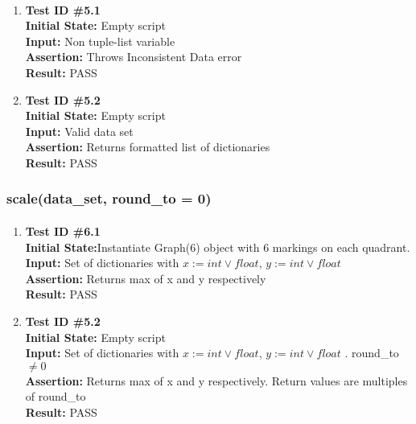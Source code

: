 \documentclass[12pt, titlepage]{article}
\begin{document}
	\paragraph{}
		\begin{enumerate}
			\item{\textbf{Test ID \#5.1\\}}
			\textbf{Initial State:} Empty script\\
			\textbf{Input:} Non tuple-list variable\\
			\textbf{Assertion:} Throws Inconsistent Data error\\
			\textbf{Result:} PASS
			
			\item{\textbf{Test ID \#5.2\\}}
			\textbf{Initial State:} Empty script\\
			\textbf{Input:} Valid data set \\
			\textbf{Assertion:} Returns formatted list of dictionaries\\
			\textbf{Result:} PASS

		\end{enumerate}		

\subsubsection{scale(data\_set, round\_to = 0)}		
	\label{sec:4.0.5}
	\paragraph{}
		\begin{enumerate}
			\item{\textbf{Test ID \#6.1\\}}
			\textbf{Initial State:}Instantiate Graph(6) object with 6 markings on each quadrant.\\
			\textbf{Input:} Set of dictionaries with $x:= int \vee float$, $y:= int \vee float$ \\
			\textbf{Assertion:} Returns max of x and y respectively\\
			\textbf{Result:} PASS
			
			\item{\textbf{Test ID \#5.2\\}}
			\textbf{Initial State:} Empty script\\
			\textbf{Input:} Set of dictionaries with $x:= int \vee float$, $y:= int \vee float$ . round\_to $\neq 0$ \\
			\textbf{Assertion:}  Returns max of x and y respectively. Return values are multiples of round\_to \\
			\textbf{Result:} PASS

		\end{enumerate}	
\end{document}
